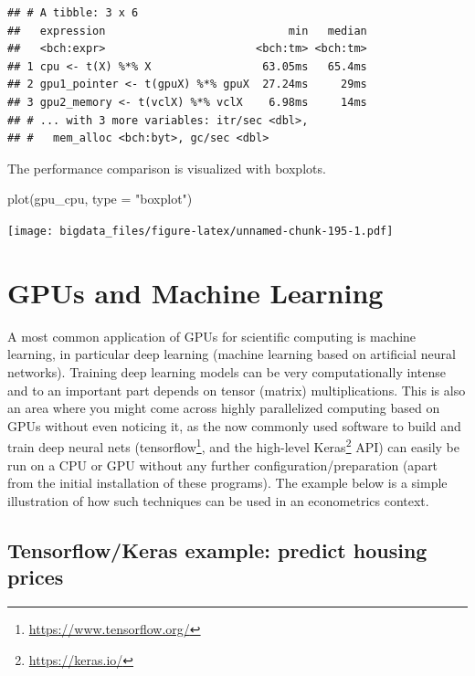 \documentclass[
  12pt,
]{style/krantz}
\newenvironment{Shaded}{\begin{snugshade}}{\end{snugshade}}
\newcommand{\AttributeTok}[1]{\textcolor[rgb]{0.77,0.63,0.00}{#1}}
\newcommand{\FunctionTok}[1]{\textcolor[rgb]{0.00,0.00,0.00}{#1}}
\newcommand{\NormalTok}[1]{#1}
\newcommand{\StringTok}[1]{\textcolor[rgb]{0.31,0.60,0.02}{#1}}
\renewcommand{\href}[2]{#2\footnote{\url{#1}}}
\begin{document}
\begin{verbatim}
## # A tibble: 3 x 6
##   expression                            min   median
##   <bch:expr>                       <bch:tm> <bch:tm>
## 1 cpu <- t(X) %*% X                 63.05ms   65.4ms
## 2 gpu1_pointer <- t(gpuX) %*% gpuX  27.24ms     29ms
## 3 gpu2_memory <- t(vclX) %*% vclX    6.98ms     14ms
## # ... with 3 more variables: itr/sec <dbl>,
## #   mem_alloc <bch:byt>, gc/sec <dbl>
\end{verbatim}

The performance comparison is visualized with boxplots.

\begin{Shaded}
\begin{Highlighting}[]
\FunctionTok{plot}\NormalTok{(gpu\_cpu, }\AttributeTok{type =} \StringTok{"boxplot"}\NormalTok{)}
\end{Highlighting}
\end{Shaded}

\texttt{[image: bigdata\_files/figure-latex/unnamed-chunk-195-1.pdf]}

\hypertarget{gpus-and-machine-learning}{%
\section{GPUs and Machine Learning}\label{gpus-and-machine-learning}}

A most common application of GPUs for scientific computing is machine learning, in particular deep learning (machine learning based on artificial neural networks). Training deep learning models can be very computationally intense and to an important part depends on tensor (matrix) multiplications. This is also an area where you might come across highly parallelized computing based on GPUs without even noticing it, as the now commonly used software to build and train deep neural nets (\href{https://www.tensorflow.org/}{tensorflow}, and the high-level \href{https://keras.io/}{Keras} API) can easily be run on a CPU or GPU without any further configuration/preparation (apart from the initial installation of these programs). The example below is a simple illustration of how such techniques can be used in an econometrics context.

\hypertarget{tensorflowkeras-example-predict-housing-prices}{%
\subsection{Tensorflow/Keras example: predict housing prices}\label{tensorflowkeras-example-predict-housing-prices}}
\end{document}
